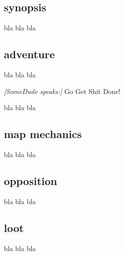 \subsection*{synopsis}

bla bla bla


\subsection*{adventure}

bla bla bla

\begin{readoutloud}
\emph{[SomeDude speaks:]}
Go Get Shit Done!
\end{readoutloud}

\noindent bla bla bla


\subsection*{map mechanics}

bla bla bla


\subsection*{opposition}

bla bla bla


\subsection*{loot}

bla bla bla























